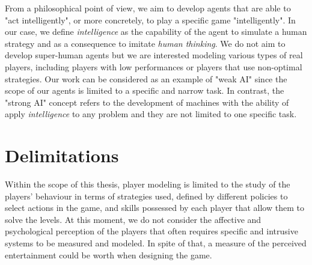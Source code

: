 From a philosophical point of view, we aim to develop agents that are able to "act intelligently", or more concretely, to play a specific game "intelligently". In our case, we define \textit{intelligence} as the capability of the agent to simulate a human strategy and as a consequence to imitate \textit{human thinking}. We do not aim to develop super-human agents but we are interested modeling various types of real players, including players with low performances or players that use non-optimal strategies. Our work can be considered as an example of "weak AI" since the scope of our agents is limited to a specific and narrow task. In contrast, the "strong AI" concept refers to the development of machines with the ability of apply \textit{intelligence} to any problem and they are not limited to one specific task. 

\section{Delimitations}\label{delimitations}


Within the scope of this thesis, player modeling is limited to the study of the players' behaviour in terms of strategies used, defined by different policies to select actions in the game, and skills possessed by each player that allow them to solve the levels. At this moment, we do not consider the affective and psychological perception of the players that often requires specific and intrusive systems to be measured and modeled. In spite of that, a measure of the perceived entertainment could be worth when designing the game.

